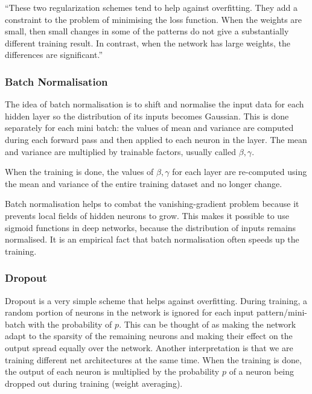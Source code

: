 \enquote{These two regularization schemes tend to help against overfitting. They add a constraint to the problem of minimising the loss function. When the weights are small, then small changes in some of the patterns do not give a substantially different training result. In contrast, when the network has large weights, the differences are significant.} \cite{mehlig}

\subsubsection{Batch Normalisation}

The idea of batch normalisation is to shift and normalise the input data for each
hidden layer so the distribution of its inputs becomes Gaussian. This is done separately for
each mini batch: the values of mean and variance are computed during each forward pass and then applied to each neuron in the layer. The mean and variance are multiplied by trainable factors, usually called $ \beta, \gamma $. \cite{stanford-L6} \cite{mehlig}

When the training is done, the values of $ \beta, \gamma $ for each layer are re-computed using the mean and variance of the entire training dataset and no longer change. \cite{issue}

Batch normalisation helps to combat the vanishing-gradient problem because it prevents local fields of hidden neurons to grow. This makes it possible to use sigmoid functions in deep networks, because the distribution of inputs remains normalised. It is an empirical fact that batch normalisation often speeds up the training. \cite{mehlig}

\subsubsection{Dropout}

Dropout is a very simple scheme that helps against overfitting. During training, a random portion of neurons in the network is ignored for each input pattern/mini-batch with the probability of $ p $. This can be thought of as making the network adapt to the sparsity of the remaining neurons and making their effect on the output spread equally over the network. Another interpretation is that we are training different net architectures at the same time. When the training is done, the output of each neuron is multiplied by the probability $ p $ of a neuron being dropped out during training (weight averaging). \cite{mehlig} \cite{stanford-L7}

